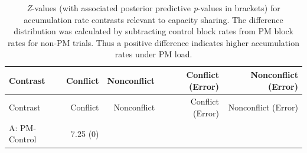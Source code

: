 \documentclass[11pt,]{article}
\begin{document}
\begin{longtable}[]{@{}lrrrr@{}}
\caption{\emph{Z}-values (with associated posterior predictive
\emph{p}-values in brackets) for accumulation rate contrasts relevant to
capacity sharing. The difference distribution was calculated by
subtracting control block rates from PM block rates for non-PM trials.
Thus a positive difference indicates higher accumulation rates under PM
load.}\tabularnewline
\toprule
\begin{minipage}[b]{0.15\columnwidth}\raggedright\strut
Contrast\strut
\end{minipage} & \begin{minipage}[b]{0.14\columnwidth}\raggedleft\strut
Conflict\strut
\end{minipage} & \begin{minipage}[b]{0.15\columnwidth}\raggedleft\strut
Nonconflict\strut
\end{minipage} & \begin{minipage}[b]{0.20\columnwidth}\raggedleft\strut
Conflict (Error)\strut
\end{minipage} & \begin{minipage}[b]{0.22\columnwidth}\raggedleft\strut
Nonconflict (Error)\strut
\end{minipage}\tabularnewline
\midrule
\endfirsthead
\toprule
\begin{minipage}[b]{0.15\columnwidth}\raggedright\strut
Contrast\strut
\end{minipage} & \begin{minipage}[b]{0.14\columnwidth}\raggedleft\strut
Conflict\strut
\end{minipage} & \begin{minipage}[b]{0.15\columnwidth}\raggedleft\strut
Nonconflict\strut
\end{minipage} & \begin{minipage}[b]{0.20\columnwidth}\raggedleft\strut
Conflict (Error)\strut
\end{minipage} & \begin{minipage}[b]{0.22\columnwidth}\raggedleft\strut
Nonconflict (Error)\strut
\end{minipage}\tabularnewline
\midrule
\endhead
\begin{minipage}[t]{0.15\columnwidth}\raggedright\strut
A: PM-Control\strut
\end{minipage} & \begin{minipage}[t]{0.14\columnwidth}\raggedleft\strut
7.25 (0)\strut
\end{minipage} & \begin{minipage}[t]{0.15\columnwidth}\raggedleft\strut

\end{minipage}
\end{longtable}
\end{document}
